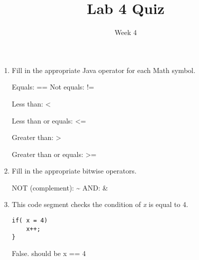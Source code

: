 \documentclass[addpoints]{exam}
\title{Lab 4 Quiz}
\date{Week 4}
\begin{document}
 

\Instructions
\begin{enumerate}
\newline
\item {}
Fill in the appropriate Java operator for each Math symbol.

\begin{oneparchoices} 
\hspace{0.2cm}

 \choice Equals:  \Ans == \vspace{1em} 
 \newline
 \choice Not equals: \Ans !=  \vspace{1em}
 \newline 

 \choice Less than: \Ans <  \vspace{1em}
 \newline 

 \choice Less than or equals: \Ans <=   \vspace{1em}
 \newline 

 \choice Greater than: \Ans >  \vspace{1em}
 \newline

 \choice Greater than or equals: \Ans >=
    \newline

 \end{oneparchoices}
 

 
\item {}
Fill in the appropriate bitwise operators.

\begin{oneparchoices} 
\hspace{0.2cm}
\vspace{2em}
 
 \choice NOT (complement): \Ans \~
 \newline
 \choice AND: \Ans  \& \vspace{1em}

 
 \end{oneparchoices}
 

 \item {} \tf
This code segment checks the condition of \textit{x} is equal to 4.
\begin{lstlisting}
if( x = 4)
    x++;
}

\end{lstlisting}
\Ans False. should be x == 4


\end{enumerate}
\end{document}
